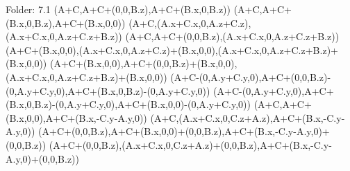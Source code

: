 Folder: 7.1
\left(A+C,A+C+\left(0,0,B.z\right),A+C+\left(B.x,0,B.z\right)\right)
\left(A+C,A+C+\left(B.x,0,B.z\right),A+C+\left(B.x,0,0\right)\right)
\left(A+C,\left(A.x+C.x,0,A.z+C.z\right),\left(A.x+C.x,0,A.z+C.z+B.z\right)\right)
\left(A+C,A+C+\left(0,0,B.z\right),\left(A.x+C.x,0,A.z+C.z+B.z\right)\right)
\left(A+C+\left(B.x,0,0\right),\left(A.x+C.x,0,A.z+C.z\right)+\left(B.x,0,0\right),\left(A.x+C.x,0,A.z+C.z+B.z\right)+\left(B.x,0,0\right)\right)
\left(A+C+\left(B.x,0,0\right),A+C+\left(0,0,B.z\right)+\left(B.x,0,0\right),\left(A.x+C.x,0,A.z+C.z+B.z\right)+\left(B.x,0,0\right)\right)
\left(A+C-\left(0,A.y+C.y,0\right),A+C+\left(0,0,B.z\right)-\left(0,A.y+C.y,0\right),A+C+\left(B.x,0,B.z\right)-\left(0,A.y+C.y,0\right)\right)
\left(A+C-\left(0,A.y+C.y,0\right),A+C+\left(B.x,0,B.z\right)-\left(0,A.y+C.y,0\right),A+C+\left(B.x,0,0\right)-\left(0,A.y+C.y,0\right)\right)
\left(A+C,A+C+\left(B.x,0,0\right),A+C+\left(B.x,-C.y-A.y,0\right)\right)
\left(A+C,\left(A.x+C.x,0,C.z+A.z\right),A+C+\left(B.x,-C.y-A.y,0\right)\right)
\left(A+C+\left(0,0,B.z\right),A+C+\left(B.x,0,0\right)+\left(0,0,B.z\right),A+C+\left(B.x,-C.y-A.y,0\right)+\left(0,0,B.z\right)\right)
\left(A+C+\left(0,0,B.z\right),\left(A.x+C.x,0,C.z+A.z\right)+\left(0,0,B.z\right),A+C+\left(B.x,-C.y-A.y,0\right)+\left(0,0,B.z\right)\right)

